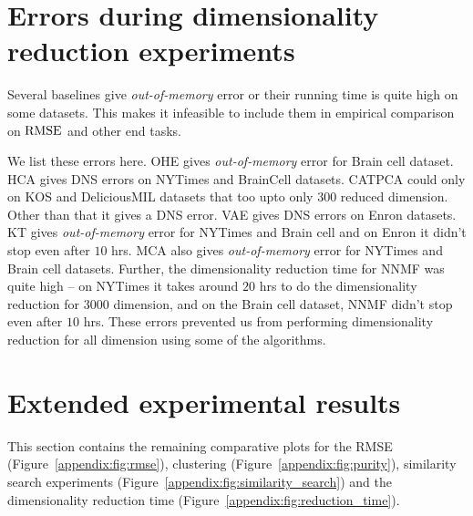 \section{Errors during dimensionality
reduction experiments}\label{sec:appendix_oom_error}
Several baselines give \textit{out-of-memory} error or their running time is quite high on some datasets. This makes it infeasible to include them in empirical comparison on $\mathrm{RMSE}$ and other end tasks.

We list these errors here. OHE gives \textit{out-of-memory} error for Brain cell dataset. { HCA gives DNS errors on NYTimes and BrainCell datasets. CATPCA could only on KOS and DeliciousMIL datasets that too upto only $300$ reduced dimension. Other than that it gives a DNS error.  VAE gives DNS errors on Enron datasets. }
 KT gives \textit{out-of-memory} error for NYTimes and Brain cell and on Enron it didn’t stop even after $10$ hrs. MCA also gives \textit{out-of-memory} error for NYTimes and Brain cell  datasets. Further, the dimensionality reduction time for NNMF was quite high -- on NYTimes it takes around $20$ hrs to do the dimensionality reduction for $3000$ dimension, and on the Brain cell dataset, NNMF didn't stop even after $10$ hrs. These errors prevented us from performing dimensionality reduction for all dimension using some of the algorithms.

\section{Extended experimental results}\label{appendix:section:extended_exp}
This section contains the remaining comparative plots for the RMSE (Figure~\ref{appendix:fig:rmse}), clustering (Figure~\ref{appendix:fig:purity}), similarity search experiments (Figure~\ref{appendix:fig:similarity_search}) and the dimensionality reduction time (Figure~\ref{appendix:fig:reduction_time}).
